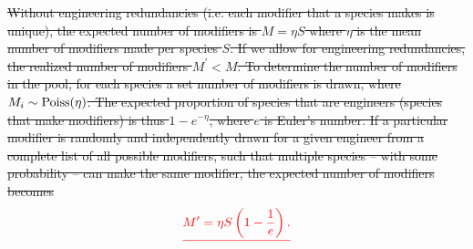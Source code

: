 \documentclass[twocolumn,preprintnumbers,amsmath,amssymb,superscriptaddress,linenumbers]{revtex4-1}
\providecommand{\DIFdel}[1]{{\protect\color{red}\sout{#1}}}                      %
\begin{document}
\DIFdel{Without engineering redundancies (i.e. each modifier that a species makes is unique), the expected number of modifiers is $M = \eta S$ where $\eta$ is the mean number of modifiers made per species $S$.
If we allow for engineering redundancies, the realized number of modifiers $M^\prime < M$.
To determine the number of modifiers in the pool, for each species a set number of modifiers is drawn, where $M_i \sim {\rm Poiss}(\eta)$.
The expected proportion of species that are engineers (species that make modifiers) is thus $1-{e}^{-\eta}$, where $e$ is Euler's number.
If a particular modifier is randomly and independently drawn for a given engineer from a complete list of all possible modifiers, such that multiple species -- with some probability -- can make the same modifier, the expected number of modifiers becomes
}\begin{displaymath}
\DIFdel{M^\prime = \eta S \left(1 - \frac{1}{{e}}\right).
}\end{displaymath}%
\end{document}
